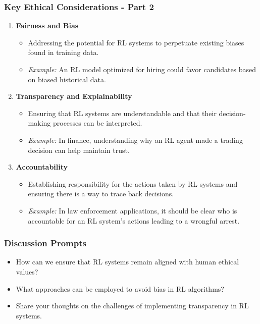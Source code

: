 \documentclass{beamer}
\begin{document}
\begin{frame}[fragile]
    \frametitle{Key Ethical Considerations - Part 2}
    \begin{enumerate}
        \item \textbf{Fairness and Bias}
            \begin{itemize}
                \item Addressing the potential for RL systems to perpetuate existing biases found in training data.
                \item \textit{Example:} An RL model optimized for hiring could favor candidates based on biased historical data.
            \end{itemize}
    
        \item \textbf{Transparency and Explainability}
            \begin{itemize}
                \item Ensuring that RL systems are understandable and that their decision-making processes can be interpreted.
                \item \textit{Example:} In finance, understanding why an RL agent made a trading decision can help maintain trust.
            \end{itemize}
    
        \item \textbf{Accountability}
            \begin{itemize}
                \item Establishing responsibility for the actions taken by RL systems and ensuring there is a way to trace back decisions.
                \item \textit{Example:} In law enforcement applications, it should be clear who is accountable for an RL system’s actions leading to a wrongful arrest.
            \end{itemize}
    \end{enumerate}
\end{frame}

\begin{frame}[fragile]
    \frametitle{Discussion Prompts}
    \begin{itemize}
        \item How can we ensure that RL systems remain aligned with human ethical values?
        \item What approaches can be employed to avoid bias in RL algorithms?
        \item Share your thoughts on the challenges of implementing transparency in RL systems.
    \end{itemize}
\end{frame}
\end{document}
